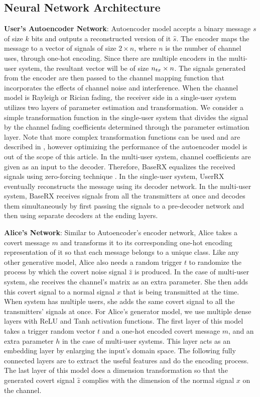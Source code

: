 \subsection{Neural Network Architecture}
\textbf{User's Autoencoder Network}: Autoencoder model accepts a binary message \(s\) of size \(k\) bits and outputs a reconstructed version of it \(\hat{s}\). The encoder maps the message to a vector of signals of size \(2 \times n\), where \(n\) is the number of channel uses, through one-hot encoding. Since there are multiple encoders in the multi-user system, the resultant vector will be of size \(n_{tx} \time 2 \times n\). The signals generated from the encoder are then passed to the channel mapping function that incorporates the effects of channel noise and interference. When the channel model is Rayleigh or Rician fading, the receiver side in a single-user system utilizes two layers of parameter estimation and transformation. We consider a simple transformation function in the single-user system that divides the signal by the channel fading coefficients determined through the parameter estimation layer. Note that more complex transformation functions can be used and are described in \cite{o2017introduction}, however optimizing the performance of the autoencoder model is out of the scope of this article. In the multi-user system, channel coefficients are given as an input to the decoder. Therefore, BaseRX equalizes the received signals using zero-forcing technique \cite{garg2010wireless}. In the single-user system, UserRX eventually reconstructs the message using its decoder network. In the multi-user system, BaseRX receives signals from all the transmitters at once and decodes them simultaneously by first passing the signals to a pre-decoder network and then using separate decoders at the ending layers.


\textbf{Alice's Network}: Similar to Autoencoder's encoder network, Alice takes a covert message \(m\) and transforms it to its corresponding one-hot encoding representation of it so that each message belongs to a unique class. Like any other generative model, Alice also needs a random trigger \(t\) to randomize the process by which the covert noise signal \(\hat{z}\) is produced. In the case of multi-user system, she receives the channel's matrix as an extra parameter. She then adds this covert signal to a normal signal \(x\) that is being transmitted at the time. When system has multiple users, she adds the same covert signal to all the transmitters' signals at once. For Alice's generator model, we use multiple dense layers with ReLU and Tanh activation functions. The first layer of this model takes a trigger random vector \(t\) and a one-hot encoded covert message \(m\), and an extra parameter \(h\) in the case of multi-user systems. This layer acts as an embedding layer by enlarging the input's domain space. The following fully connected layers are to extract the useful features and do the encoding process. The last layer of this model does a dimension transformation so that the generated covert signal \(\hat{z}\) complies with the dimension of the normal signal \(x\) on the channel. 


